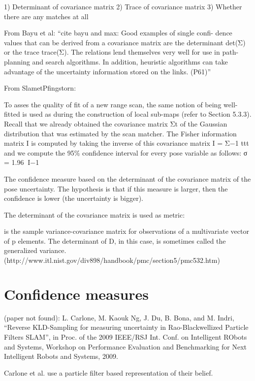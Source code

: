 1) Determinant of covariance matrix
2) Trace of covariance matrix
3) Whether there are any matches at all


From Bayu et al: ``cite bayu and max:     Good examples of single confi- dence values that can be derived from a covariance matrix are the determinant det(Σ) or the trace trace(Σ). The relations lend themselves very well for use in path-planning and search algorithms. In addition, heuristic algorithms can take advantage of the uncertainty information stored on the links. (P61)''


From SlametPfingstorn:

To asses the quality of fit
of a new range scan, the same notion of being well-fitted is used as during the construction
of local sub-maps (refer to Section 5.3.3). Recall that we already obtained the covariance
matrix Σt of the Gaussian distribution that was estimated by the scan matcher. The Fisher
information matrix I is computed by taking the inverse of this covariance matrix I = Σ−1 ttt
and we compute the 95\% confidence interval for every pose variable as follows: σ = 1.96􏰌􏰀I−1􏰁



The confidence measure based on the determinant of the covariance matrix of the pose uncertainty. The hypothesis is that if this measure is larger, then the confidence is lower (the uncertainty is bigger).

The determinant of the covariance matrix is used as metric:

is the sample variance-covariance matrix for observations of a multivariate vector of p elements. The determinant of D, in this case, is sometimes called the generalized variance. (http://www.itl.nist.gov/div898/handbook/pmc/section5/pmc532.htm)

\section{Confidence measures}

(paper not found): L. Carlone, M. Kaouk Ng, J. Du, B. Bona, and M. Indri, “Reverse KLD-Sampling for measuring uncertainty in Rao-Blackwellized Particle Filters SLAM”, in Proc. of the 2009 IEEE/RSJ Int. Conf. on Intelligent RObots and Systems, Workshop on Performance Evaluation and Benchmarking for Next Intelligent Robots and Systems, 2009.

Carlone et al. use a particle filter based representation of their belief. 

